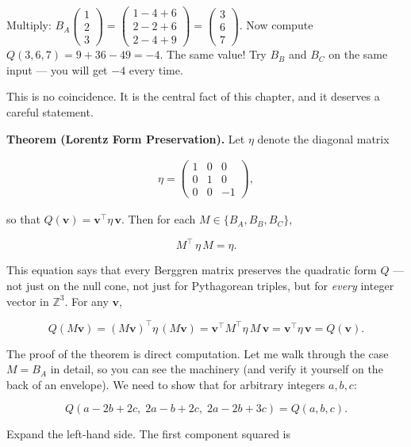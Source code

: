 \documentclass[11pt,twoside,openright]{book}
\theoremstyle{definition}
\theoremstyle{remark}
\begin{document}
Multiply: $B_A \begin{pmatrix} 1 \\ 2 \\ 3 \end{pmatrix} = \begin{pmatrix} 1 - 4 + 6 \\ 2 - 2 + 6 \\ 2 - 4 + 9 \end{pmatrix} = \begin{pmatrix} 3 \\ 6 \\ 7 \end{pmatrix}.$ Now compute $Q(3, 6, 7) = 9 + 36 - 49 = -4.$ The same value! Try $B_B$ and $B_C$ on the same input --- you will get $-4$ every time.

This is no coincidence. It is the central fact of this chapter, and it deserves a careful statement.

\textbf{Theorem (Lorentz Form Preservation).} Let $\eta$ denote the diagonal matrix

\begin{align*}
\eta = \begin{pmatrix} 1 & 0 & 0 \\ 0 & 1 & 0 \\ 0 & 0 & -1 \end{pmatrix},
\end{align*}

so that $Q(\mathbf{v}) = \mathbf{v}^\top \eta\, \mathbf{v}$. Then for each $M \in \{B_A, B_B, B_C\}$,

\[M^{\!\top}\, \eta\, M = \eta.\]

This equation says that every Berggren matrix preserves the quadratic form $Q$ --- not just on the null cone, not just for Pythagorean triples, but for \textit{every} integer vector in $\mathbb{Z}^3$. For any $\mathbf{v}$,

\[Q(M\mathbf{v}) = (M\mathbf{v})^\top \eta\, (M\mathbf{v}) = \mathbf{v}^\top M^\top \eta\, M\, \mathbf{v} = \mathbf{v}^\top \eta\, \mathbf{v} = Q(\mathbf{v}).\]

The proof of the theorem is direct computation. Let me walk through the case $M = B_A$ in detail, so you can see the machinery (and verify it yourself on the back of an envelope). We need to show that for arbitrary integers $a, b, c$:

\[Q(a - 2b + 2c,\; 2a - b + 2c,\; 2a - 2b + 3c) = Q(a, b, c).\]

Expand the left-hand side. The first component squared is
\end{document}
